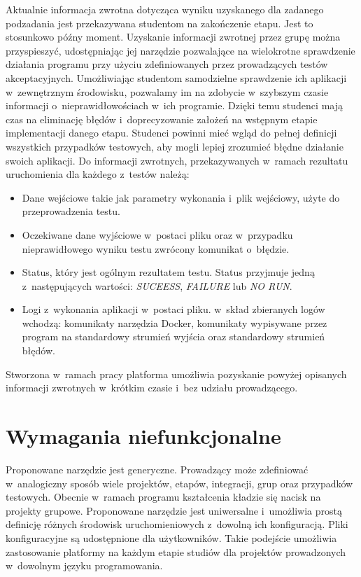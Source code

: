 Aktualnie informacja zwrotna dotycząca wyniku uzyskanego dla zadanego podzadania jest przekazywana studentom na zakończenie etapu.
Jest to stosunkowo późny moment.
Uzyskanie informacji zwrotnej przez grupę można przyspieszyć, udostępniając jej narzędzie pozwalające na wielokrotne sprawdzenie działania programu przy użyciu zdefiniowanych przez prowadzących testów akceptacyjnych.
Umożliwiając studentom samodzielne sprawdzenie ich aplikacji w~zewnętrznym środowisku, pozwalamy im na zdobycie w~szybszym czasie informacji o~nieprawidłowościach w~ich programie.
Dzięki temu studenci mają czas na eliminację błędów i~doprecyzowanie założeń na wstępnym etapie implementacji danego etapu.
Studenci powinni mieć wgląd do pełnej definicji wszystkich przypadków testowych, aby mogli lepiej zrozumieć błędne działanie swoich aplikacji.
Do informacji zwrotnych, przekazywanych w~ramach rezultatu uruchomienia dla każdego z~testów należą:
\begin{itemize}
    \item Dane wejściowe takie jak parametry wykonania i~plik wejściowy, użyte do przeprowadzenia testu.
    \item Oczekiwane dane wyjściowe w~postaci pliku oraz w~przypadku nieprawidłowego wyniku testu zwrócony komunikat o~błędzie.
    \item Status, który jest ogólnym rezultatem testu.
    Status przyjmuje jedną z~następujących wartości: \textit{SUCEESS}, \textit{FAILURE} lub \textit{NO RUN}.
    \item Logi z~wykonania aplikacji w~postaci pliku.
    w~skład zbieranych logów wchodzą: komunikaty narzędzia Docker, komunikaty wypisywane przez program na standardowy strumień wyjścia oraz standardowy strumień błędów.
\end{itemize}

Stworzona w~ramach pracy platforma umożliwia pozyskanie powyżej opisanych informacji zwrotnych w~krótkim czasie i~bez udziału prowadzącego.


\section{Wymagania niefunkcjonalne}

Proponowane narzędzie jest generyczne.
Prowadzący może zdefiniować w~analogiczny sposób wiele projektów, etapów, integracji, grup oraz przypadków testowych.
Obecnie w~ramach programu kształcenia kładzie się nacisk na projekty grupowe.
Proponowane narzędzie jest uniwersalne i~umożliwia prostą definicję różnych środowisk uruchomieniowych z~dowolną ich konfiguracją.
Pliki konfiguracyjne są udostępnione dla użytkowników.
Takie podejście umożliwia zastosowanie platformy na każdym etapie studiów dla projektów prowadzonych w~dowolnym języku programowania.

